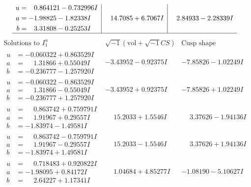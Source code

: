 \documentclass[1p]{elsarticle_modified}
\theoremstyle{definition}
\newcommand{\I}{\sqrt{-1}}
\begin{document}
$$\begin{array}{c|c|c}
\begin{aligned}
u &= \phantom{-}0.864121 - 0.732996 I \\
a &= -1.98825 - 1.82338 I \\
b &= \phantom{-}3.31808 - 0.25253 I\end{aligned}
 & \phantom{-}14.7085 + 6.7067 I & \phantom{-}2.84933 - 2.28339 I\\
 \hline 
 \end{array}$$\newpage$$\begin{array}{c|c|c}  
\text{Solutions to }I^u_{1}& \I (\text{vol} + \sqrt{-1}CS) & \text{Cusp shape}\\
 \hline 
\begin{aligned}
u &= -0.060322 + 0.863529 I \\
a &= \phantom{-}1.31866 + 0.55049 I \\
b &= -0.236777 - 1.257920 I\end{aligned}
 & -3.43952 - 0.92375 I & -7.85826 - 1.02249 I \\ \hline\begin{aligned}
u &= -0.060322 - 0.863529 I \\
a &= \phantom{-}1.31866 - 0.55049 I \\
b &= -0.236777 + 1.257920 I\end{aligned}
 & -3.43952 + 0.92375 I & -7.85826 + 1.02249 I \\ \hline\begin{aligned}
u &= \phantom{-}0.863742 + 0.759791 I \\
a &= \phantom{-}1.91967 + 0.29557 I \\
b &= -1.83974 - 1.49581 I\end{aligned}
 & \phantom{-}15.2033 + 1.5546 I & \phantom{-}3.37626 - 1.94136 I \\ \hline\begin{aligned}
u &= \phantom{-}0.863742 - 0.759791 I \\
a &= \phantom{-}1.91967 - 0.29557 I \\
b &= -1.83974 + 1.49581 I\end{aligned}
 & \phantom{-}15.2033 - 1.5546 I & \phantom{-}3.37626 + 1.94136 I \\ \hline\begin{aligned}
u &= \phantom{-}0.718483 + 0.920822 I \\
a &= -1.98095 + 0.84172 I \\
b &= \phantom{-}2.64227 + 1.17341 I\end{aligned}
 & \phantom{-}1.04684 + 4.85277 I & -1.08190 - 5.10627 I \\ \hline\begin{aligned}

\end{aligned}
\end{array}$$
\end{document}

